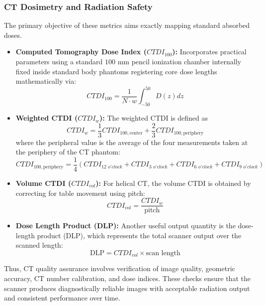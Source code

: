 \subsubsection{CT Dosimetry and Radiation Safety}
The primary objective of these metrics aims exactly mapping standard absorbed doses.
\begin{itemize}
    \item \textbf{Computed Tomography Dose Index ($CTDI_{100}$):} Incorporates practical parameters using a standard $100\text{ mm}$ pencil ionization chamber internally fixed inside standard body phantoms registering core dose lengths mathematically via:
    \begin{equation}
        CTDI_{100} = \frac{1}{N \cdot w} \int_{-50}^{50} D(z) dz
    \end{equation}
    \item \textbf{Weighted CTDI ($CTDI_w$):} The weighted CTDI is defined as
    \begin{equation}
        CTDI_w = \frac{1}{3} CTDI_{100, \text{center}} + \frac{2}{3} CTDI_{100, \text{periphery}}
    \end{equation}
    where the peripheral value is the average of the four measurements taken at the periphery of the CT phantom:
    \begin{equation}
        CTDI_{100, \text{periphery}} = \frac{1}{4} (CTDI_{12 \textit{ o'clock}} + CTDI_{3 \textit{ o'clock}} + CTDI_{6 \textit{ o'clock}} + CTDI_{9 \textit{ o'clock}})
    \end{equation}
    \item \textbf{Volume CTDI ($CTDI_{vol}$):} For helical CT, the volume CTDI is obtained by correcting for table movement using pitch:
    \begin{equation}
        CTDI_{vol} = \frac{CTDI_w}{\text{pitch}}
    \end{equation}
    \item \textbf{Dose Length Product (DLP):} Another useful output quantity is the dose-length product (DLP), which represents the total scanner output over the scanned length:
    \begin{equation}
        \text{DLP} = CTDI_{vol} \times \text{scan length}
    \end{equation}
\end{itemize}

Thus, CT quality assurance involves verification of image quality, geometric accuracy, CT number calibration, and dose indices. These checks ensure that the scanner produces diagnostically reliable images with acceptable radiation output and consistent performance over time.

